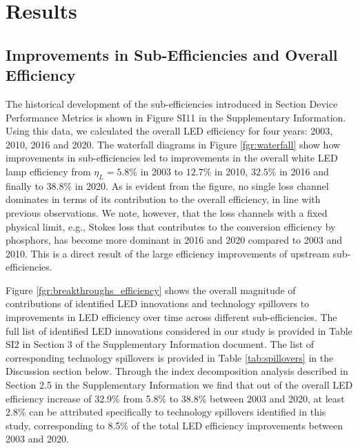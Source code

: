 \documentclass[journal=jacsat,manuscript=article]{achemso}
\begin{document}
\clearpage
\section{Results}

\subsection{Improvements in Sub-Efficiencies and Overall Efficiency}

The historical development of the sub-efficiencies introduced in Section Device Performance Metrics is shown in Figure SI11 in the Supplementary Information. Using this data, we calculated the overall LED efficiency for four years: 2003, 2010, 2016 and 2020. The waterfall diagrams in Figure \ref{fgr:waterfall} show how improvements in sub-efficiencies led to improvements in the overall white LED lamp efficiency from $\eta_L=5.8\%$ in 2003 to $12.7\%$ in 2010, $32.5\%$ in 2016 and finally to $38.8\%$ in 2020. As is evident from the figure, no single loss channel dominates in terms of its contribution to the overall efficiency, in line with previous observations\cite{tsao2010solid}. We note, however, that the loss channels with a fixed physical limit, e.g., Stokes loss that contributes to the conversion efficiency by phosphors, has become more dominant in 2016 and 2020 compared to 2003 and 2010. This is a direct result of the large efficiency improvements of upstream sub-efficiencies.

Figure \ref{fgr:breakthroughs_efficiency} shows the overall magnitude of contributions of identified LED innovations and technology spillovers to improvements in LED efficiency over time across different sub-efficiencies. The full list of identified LED innovations considered in our study is provided in Table SI2 in Section 3 of the Supplementary Information document. The list of corresponding technology spillovers is provided in Table \ref{tab:spillovers} in the Discussion section below. Through the index decomposition analysis described in Section 2.5 in the Supplementary Information we find that out of the overall LED efficiency increase of 32.9\% from 5.8\% to 38.8\% between 2003 and 2020, at least 2.8\% can be attributed specifically to technology spillovers identified in this study, corresponding to 8.5\% of the total LED efficiency improvements between 2003 and 2020.
\end{document}
